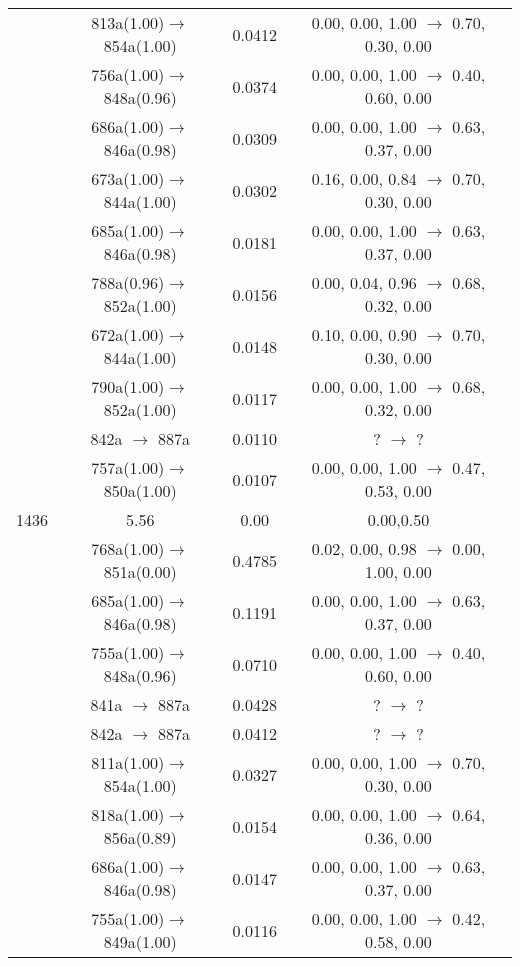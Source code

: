 \documentclass[10pt,a4paper]{article}
\begin{document}
\begin{longtable}{c|c|c|c}
 	& 813a(1.00)$\rightarrow$854a(1.00) &	 0.0412 &	 0.00, 0.00, 1.00 $\rightarrow$ 0.70, 0.30, 0.00 \\ 
 	& 756a(1.00)$\rightarrow$848a(0.96) &	 0.0374 &	 0.00, 0.00, 1.00 $\rightarrow$ 0.40, 0.60, 0.00 \\ 
 	& 686a(1.00)$\rightarrow$846a(0.98) &	 0.0309 &	 0.00, 0.00, 1.00 $\rightarrow$ 0.63, 0.37, 0.00 \\ 
 	& 673a(1.00)$\rightarrow$844a(1.00) &	 0.0302 &	 0.16, 0.00, 0.84 $\rightarrow$ 0.70, 0.30, 0.00 \\ 
 	& 685a(1.00)$\rightarrow$846a(0.98) &	 0.0181 &	 0.00, 0.00, 1.00 $\rightarrow$ 0.63, 0.37, 0.00 \\ 
 	& 788a(0.96)$\rightarrow$852a(1.00) &	 0.0156 &	 0.00, 0.04, 0.96 $\rightarrow$ 0.68, 0.32, 0.00 \\ 
 	& 672a(1.00)$\rightarrow$844a(1.00) &	 0.0148 &	 0.10, 0.00, 0.90 $\rightarrow$ 0.70, 0.30, 0.00 \\ 
 	& 790a(1.00)$\rightarrow$852a(1.00) &	 0.0117 &	 0.00, 0.00, 1.00 $\rightarrow$ 0.68, 0.32, 0.00 \\ 
 	& 842a $\rightarrow$ 887a &	 0.0110 &	 ? $\rightarrow$ ?  \\ 
 	& 757a(1.00)$\rightarrow$850a(1.00) &	 0.0107 &	 0.00, 0.00, 1.00 $\rightarrow$ 0.47, 0.53, 0.00 \\ 
 \hline1436 &	 5.56 &	 0.00 &	 0.00,0.50 \\ 
  	& 768a(1.00)$\rightarrow$851a(0.00) &	 0.4785 &	 0.02, 0.00, 0.98 $\rightarrow$ 0.00, 1.00, 0.00 \\ 
 	& 685a(1.00)$\rightarrow$846a(0.98) &	 0.1191 &	 0.00, 0.00, 1.00 $\rightarrow$ 0.63, 0.37, 0.00 \\ 
 	& 755a(1.00)$\rightarrow$848a(0.96) &	 0.0710 &	 0.00, 0.00, 1.00 $\rightarrow$ 0.40, 0.60, 0.00 \\ 
 	& 841a $\rightarrow$ 887a &	 0.0428 &	 ? $\rightarrow$ ?  \\ 
 	& 842a $\rightarrow$ 887a &	 0.0412 &	 ? $\rightarrow$ ?  \\ 
 	& 811a(1.00)$\rightarrow$854a(1.00) &	 0.0327 &	 0.00, 0.00, 1.00 $\rightarrow$ 0.70, 0.30, 0.00 \\ 
 	& 818a(1.00)$\rightarrow$856a(0.89) &	 0.0154 &	 0.00, 0.00, 1.00 $\rightarrow$ 0.64, 0.36, 0.00 \\ 
 	& 686a(1.00)$\rightarrow$846a(0.98) &	 0.0147 &	 0.00, 0.00, 1.00 $\rightarrow$ 0.63, 0.37, 0.00 \\ 
 	& 755a(1.00)$\rightarrow$849a(1.00) &	 0.0116 &	 0.00, 0.00, 1.00 $\rightarrow$ 0.42, 0.58, 0.00 \\ 

\end{longtable}
\end{document}
